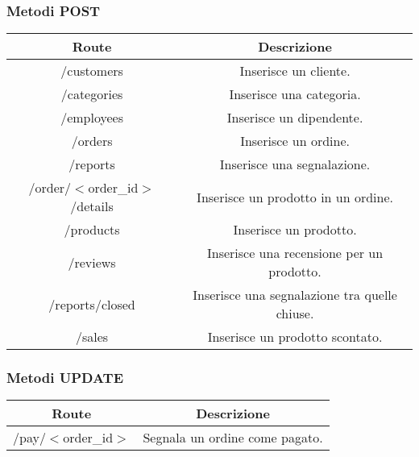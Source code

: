 \subsubsection{Metodi POST}
\begin{center}
\begin{tabular}{|c|c|}
\hline
Route & Descrizione\\
\hline
\multirow{2}{20em}{/customers} & \multirow{2}{15em}{Inserisce un cliente.}\\
 & \\
\hline
\multirow{2}{20em}{/categories} & \multirow{2}{15em}{ Inserisce una categoria.}\\
 & \\
\hline
\multirow{2}{20em}{/employees} & \multirow{2}{15em}{Inserisce un dipendente.}\\
 & \\
\hline
\multirow{2}{20em}{/orders} & \multirow{2}{15em}{Inserisce un ordine.}\\
 & \\
\hline
\multirow{2}{20em}{/reports} & \multirow{2}{15em}{Inserisce una segnalazione.}\\
 & \\
\hline
\multirow{2}{20em}{/order/$<$order\_id$>$/details} & \multirow{2}{15em}{Inserisce un prodotto in un ordine.}\\
 & \\
\hline
\multirow{2}{20em}{/products} & \multirow{2}{15em}{Inserisce un prodotto.}\\
 & \\
\hline
\multirow{2}{20em}{/reviews} & \multirow{2}{15em}{Inserisce una recensione per un prodotto.}\\
 & \\
\hline
\multirow{2}{20em}{/reports/closed} & \multirow{2}{15em}{Inserisce una segnalazione tra quelle chiuse.}\\
 & \\
\hline
\multirow{2}{20em}{/sales} & \multirow{2}{15em}{Inserisce un prodotto scontato.}\\
 & \\
\hline
\end{tabular}
\end{center}

\subsubsection{Metodi UPDATE}
\begin{center}
\begin{tabular}{|c|c|}
\hline
Route & Descrizione \\
\hline
\multirow{2}{20em}{/pay/$<$order\_id$>$} & \multirow{2}{15em}{ Segnala un ordine come pagato.}\\
 & \\
 \hline
\end{tabular}
\end{center}